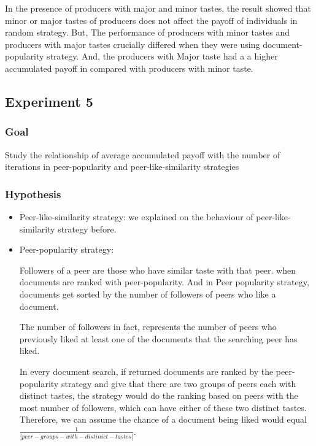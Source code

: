 \documentclass [12pt]{article} \usepackage{multicol}
\begin{document}
In the presence of producers with major and minor tastes, the result showed that minor or major tastes of producers does not affect the 
payoff of individuals in random strategy. But, The performance of producers with minor tastes and producers with major tastes crucially differed when they were using document-popularity
strategy. And, the producers with Major taste had a a higher accumulated payoff in compared with producers with minor taste. 




\subsection{Experiment 5}
\subsubsection{Goal}
 Study the relationship of average accumulated payoff with the number of iterations  in peer-popularity and peer-like-similarity strategies
\subsubsection{Hypothesis}

\begin{itemize}

\item Peer-like-similarity strategy:
we explained on the behaviour of peer-like-similarity strategy before. 

\item Peer-popularity strategy: 

Followers of a peer are those who have similar taste with that peer. 
when  documents are ranked with peer-popularity. And in Peer popularity strategy, documents get sorted by the number of followers of peers who like a document.

The number of followers in fact, represents the number of peers who previously liked at least one of the documents that the searching peer has liked. 

In every document search, if returned documents are ranked by the peer-popularity strategy and give that there are two groups of peers each with distinct tastes,
the  strategy would do the ranking based on peers with the most number of followers, which can have either of these two distinct tastes. 
Therefore, we can assume the chance of a document being liked would equal $\frac{1}{|peer-groups-with-distinict-tastes|} $.

\end{itemize}
\end{document}
